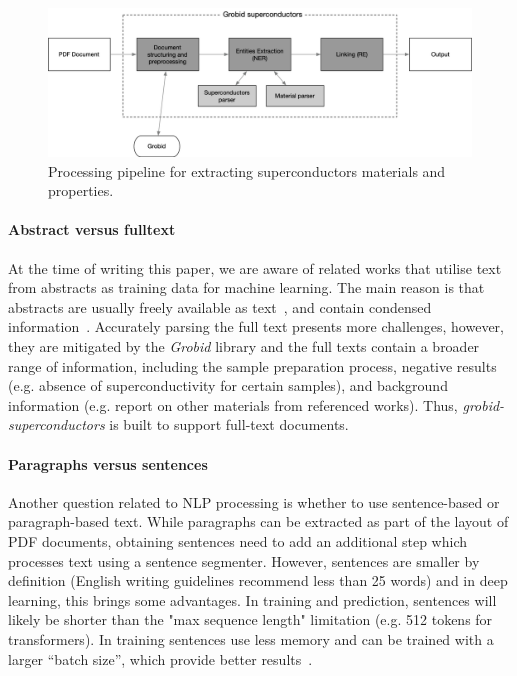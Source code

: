 \documentclass{article}
\begin{document}
\begin{figure}[ht]
\includegraphics[width=\textwidth]{overview-schema-3}
\caption{Processing pipeline for extracting superconductors materials and properties. }
\label{fig:pipeline-overview}
\end{figure}

\paragraph{Abstract versus fulltext}
At the time of writing this paper, we are aware of related works that utilise text from abstracts as training data for machine learning. 
The main reason is that abstracts are usually freely available as text~\cite{kononova_text-mined_2019}, and contain condensed information~\cite{yamaguchi-etal-2020-sc, court_magnetic_2020}. 
Accurately parsing the full text presents more challenges, however, they are mitigated by the \textit{Grobid} library and the full texts contain a broader range of information, including the sample preparation process, negative results (e.g. absence of superconductivity for certain samples), and background information (e.g. report on other materials from referenced works). 
Thus, \textit{grobid-superconductors} is built to support full-text documents. 

\paragraph{Paragraphs versus sentences}
Another question related to NLP processing is whether to use sentence-based or paragraph-based text. 
While paragraphs can be extracted as part of the layout of PDF documents, obtaining sentences need to add an additional step which processes text using a sentence segmenter.
However, sentences are smaller by definition (English writing guidelines recommend less than 25 words) and in deep learning, this brings some advantages. 
In training and prediction, sentences will likely be shorter than the "max sequence length" limitation (e.g. 512 tokens for transformers). 
In training sentences use less memory and can be trained with a larger ``batch size'', which provide better results~\cite{roberta}.
\end{document}
